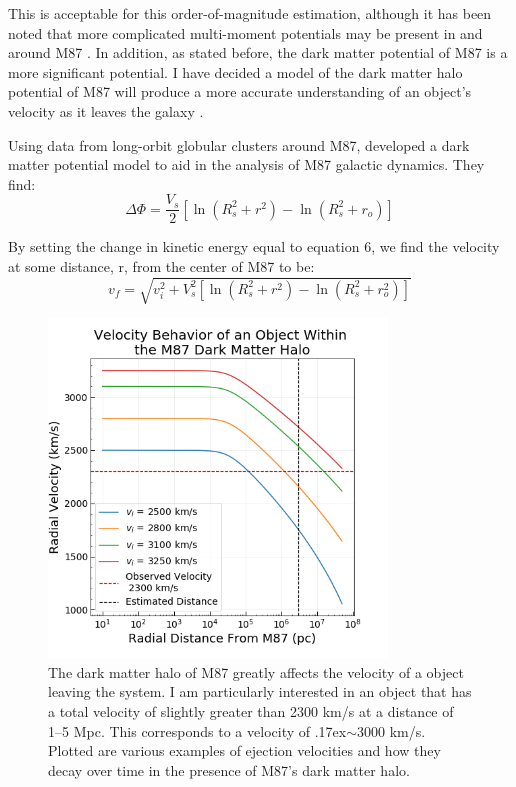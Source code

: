 \documentclass{aastex62}
\begin{document}
This is acceptable for this order-of-magnitude estimation, although it has been noted that more complicated multi-moment potentials may be present in and around M87 \citep{mur14}. In addition, as stated before, the dark matter potential of M87 is a more significant potential. I have decided a model of the dark matter halo potential of M87 will produce a more accurate understanding of an object's velocity as it leaves the galaxy \citep{zhu14}. 

Using data from long-orbit globular clusters around M87, \citet{zhu14} developed a dark matter potential model to aid in the analysis of M87 galactic dynamics. They find:
\begin{equation}
\Delta\Phi = \frac{V_{s}}{2}[\ln(R_{s}^2 + r^2) - \ln(R_{s}^2 + r_{o})]
\end{equation}

By setting the change in kinetic energy equal to equation 6, we find the velocity at some distance, r, from the center of M87 to be:
\begin{equation}
v_{f} = \sqrt{v_{i}^2 + V_{s}^{2}[\ln(R_{s}^2 + r^2) - \ln(R_{s}^2 + r_{o}^2)]}
\end{equation}

\begin{figure}
\includegraphics[width=9cm,height=9cm]{./Images/velocity_behavior.png}
\centering
\caption{The dark matter halo of M87 greatly affects the velocity of a object leaving the system. I am particularly interested in an object that has a total velocity of slightly greater than 2300 km/s at a distance of 1--5 Mpc. This corresponds to a velocity of  {\raise.17ex\hbox{$\scriptstyle\mathtt{\sim}$}}3000 km/s. Plotted are various examples of ejection velocities and how they decay over time in the presence of M87's dark matter halo. \label{fig1}}
\end{figure}
\end{document}

